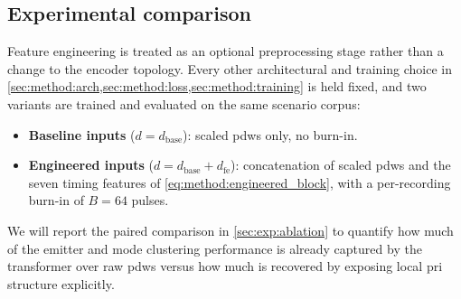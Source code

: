 \subsection{Experimental comparison}\label{sec:method:features:ablation}

Feature engineering is treated as an optional preprocessing stage rather than a change to the encoder topology.
Every other architectural and training choice in \cref{sec:method:arch,sec:method:loss,sec:method:training} is held fixed, and two variants are trained and evaluated on the same scenario corpus:
\begin{itemize}
  \item \textbf{Baseline inputs} ($d = d_{\mathrm{base}}$): scaled \glspl{pdw} only, no burn-in.
  \item \textbf{Engineered inputs} ($d = d_{\mathrm{base}} + d_{\mathrm{fe}}$): concatenation of scaled \glspl{pdw} and the seven timing features of \cref{eq:method:engineered_block}, with a per-recording burn-in of $B = 64$ pulses.
\end{itemize}
We will report the paired comparison in \cref{sec:exp:ablation} to quantify how much of the emitter and mode clustering performance is already captured by the transformer over raw \glspl{pdw} versus how much is recovered by exposing local \gls{pri} structure explicitly.
